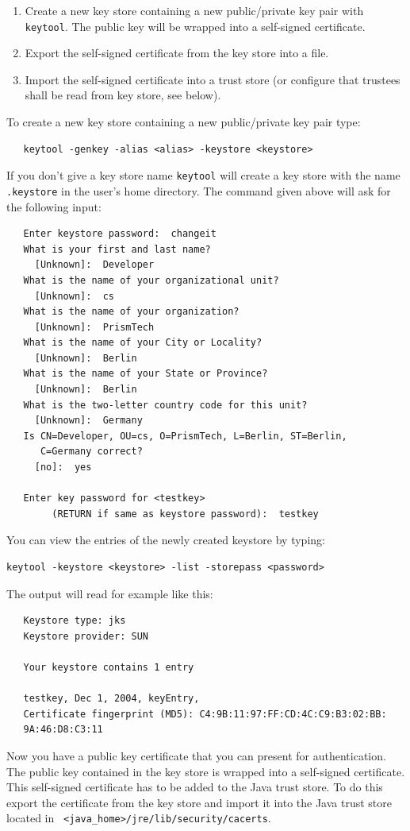 \begin{enumerate}
\item Create a new key store containing a new public/private key pair
with {\tt keytool}. The public key will be wrapped into a self-signed certificate.  
\item Export the self-signed certificate from the key store into a file.
\item Import the self-signed certificate into a trust store
   (or configure that trustees shall be read from key store, see below). 
\end{enumerate}
To create a new key store containing a new public/private key pair type: 
\begin{verbatim}
   keytool -genkey -alias <alias> -keystore <keystore>
\end{verbatim}
If you don't give a key store name {\tt keytool} will create a key store with
the name {\tt .keystore} in the user's home directory. The command
given above will ask for the following input: 
\begin{verbatim}
   Enter keystore password:  changeit
   What is your first and last name?
     [Unknown]:  Developer
   What is the name of your organizational unit?
     [Unknown]:  cs
   What is the name of your organization?
     [Unknown]:  PrismTech
   What is the name of your City or Locality?
     [Unknown]:  Berlin
   What is the name of your State or Province?
     [Unknown]:  Berlin
   What is the two-letter country code for this unit?
     [Unknown]:  Germany
   Is CN=Developer, OU=cs, O=PrismTech, L=Berlin, ST=Berlin, 
      C=Germany correct?
     [no]:  yes

   Enter key password for <testkey>
        (RETURN if same as keystore password):  testkey
\end{verbatim}
You can view the entries of the newly created keystore by typing:
\begin{verbatim}
keytool -keystore <keystore> -list -storepass <password>
\end{verbatim}
The output will read for example like this:

\begin{verbatim}
   Keystore type: jks
   Keystore provider: SUN

   Your keystore contains 1 entry

   testkey, Dec 1, 2004, keyEntry,
   Certificate fingerprint (MD5): C4:9B:11:97:FF:CD:4C:C9:B3:02:BB:
   9A:46:D8:C3:11
\end{verbatim}

Now you have a public key certificate that you can present for
authentication. The public key contained in the key store is wrapped
into a self-signed certificate. This self-signed certificate has to be
added to the Java trust store. To do this export the certificate from
the key store and import it into the Java trust store located in {\tt
<java\_home>/jre/lib/security/cacerts}.  

